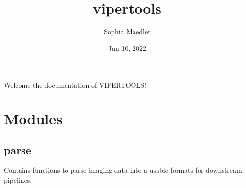 \documentclass[a4paper,10pt,english,openany,oneside]{sphinxmanual}
\title{vipertools}
\date{Jun 10, 2022}
\author{Sophia Maedler}
\begin{document}
\pagestyle{empty}
\sphinxmaketitle
\pagestyle{plain}
\sphinxtableofcontents
\pagestyle{normal}
\label{\detokenize{index::doc}}


\sphinxAtStartPar
Welcome the documentation of VIPERTOOLS!


\chapter{Modules}
\label{\detokenize{pages/modules:module-vipertools.parse}}\label{\detokenize{pages/modules:modules}}\label{\detokenize{pages/modules::doc}}

\section{parse}
\label{\detokenize{pages/modules:parse}}
\sphinxAtStartPar
Contains functions to parse imaging data into a usable formats for downstream pipelines.
\end{document}
